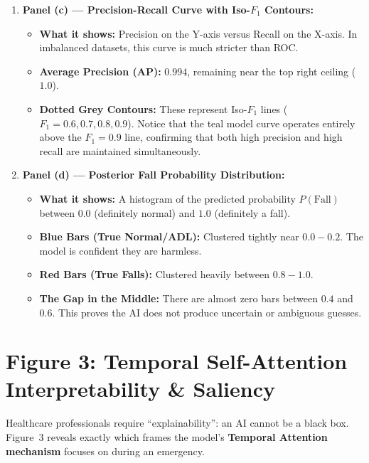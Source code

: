 \documentclass[11pt,a4paper]{article}
\begin{document}
\begin{enumerate}
    \item \textbf{Panel (c) --- Precision-Recall Curve with Iso-$F_1$ Contours:}
    \begin{itemize}
        \item \textbf{What it shows:} Precision on the Y-axis versus Recall on the X-axis. In imbalanced datasets, this curve is much stricter than ROC.
        \item \textbf{Average Precision (AP):} $\mathbf{0.994}$, remaining near the top right ceiling ($1.0$).
        \item \textbf{Dotted Grey Contours:} These represent Iso-$F_1$ lines ($F_1 = 0.6, 0.7, 0.8, 0.9$). Notice that the teal model curve operates entirely above the $F_1 = 0.9$ line, confirming that both high precision and high recall are maintained simultaneously.
    \end{itemize}

    \item \textbf{Panel (d) --- Posterior Fall Probability Distribution:}
    \begin{itemize}
        \item \textbf{What it shows:} A histogram of the predicted probability $P(\text{Fall})$ between $0.0$ (definitely normal) and $1.0$ (definitely a fall).
        \item \textbf{Blue Bars (True Normal/ADL):} Clustered tightly near $0.0 - 0.2$. The model is confident they are harmless.
        \item \textbf{Red Bars (True Falls):} Clustered heavily between $0.8 - 1.0$.
        \item \textbf{The Gap in the Middle:} There are almost zero bars between $0.4$ and $0.6$. This proves the AI does not produce uncertain or ambiguous guesses.
    \end{itemize}
\end{enumerate}

\newpage

\section{Figure 3: Temporal Self-Attention Interpretability \& Saliency}

Healthcare professionals require ``explainability'': an AI cannot be a black box. Figure~3 reveals exactly which frames the model's \textbf{Temporal Attention mechanism} focuses on during an emergency.
\end{document}
